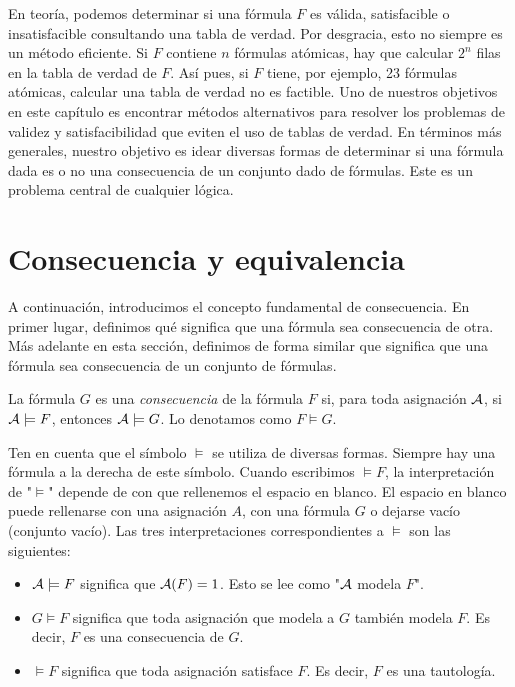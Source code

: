 \message{ !name(main.tex)}\documentclass[12pt,a4paper]{book}
\newcommand{\comillas}[1]{"#1"}
\begin{document}
    En teoría, podemos determinar si una fórmula $F$ es válida, satisfacible o insatisfacible consultando una tabla de verdad. Por desgracia, esto no siempre
    es un método eficiente. Si $F$ contiene $n$ fórmulas atómicas, hay que calcular $2^{n}$ filas en la tabla de verdad de $F$. Así pues, si $F$ tiene, por ejemplo,
    23 fórmulas atómicas, calcular una tabla de verdad no es factible. Uno de nuestros objetivos en este capítulo es encontrar métodos alternativos para resolver
    los problemas de validez y satisfacibilidad que eviten el uso de tablas de verdad. En términos más generales, nuestro objetivo es idear diversas formas de
    determinar si una fórmula dada es o no una consecuencia de un conjunto dado de fórmulas. Este es un problema central de cualquier lógica.

    \section{Consecuencia y equivalencia}

    A continuación, introducimos el concepto fundamental de consecuencia. En primer lugar, definimos qué significa que una fórmula sea consecuencia
    de otra. Más adelante en esta sección, definimos de forma similar que significa que una fórmula sea consecuencia de un conjunto de fórmulas.

    \begin{definicion}
        La fórmula $G$ es una \textit{consecuencia} de la fórmula $F$ si, para toda asignación $\AA$, si $\AA\models F$, entonces $\AA\models G$. Lo denotamos como
        $F\models G$.
    \end{definicion}

    Ten en cuenta que el símbolo $\models$ se utiliza de diversas formas. Siempre hay una fórmula a la derecha de este símbolo. Cuando escribimos $\models F$,
    la interpretación de \comillas{$\models$} depende de con que rellenemos el espacio en blanco. El espacio en blanco puede rellenarse con una asignación $A$,
    con una fórmula $G$ o dejarse vacío (conjunto vacío). Las tres interpretaciones correspondientes a $\models$ son las siguientes:

    \begin{itemize}
        \item[$\bullet$] $\AA\models F$ significa que $\AA(F)=1$. Esto se lee como \comillas{$\AA$ modela $F$}.
        \item[$\bullet$] $G\models F$ significa que toda asignación que modela a $G$ también modela $F$. Es decir, $F$ es una consecuencia de $G$.
        \item[$\bullet$] $\models F$ significa que toda asignación satisface $F$. Es decir, $F$ es una tautología.
    \end{itemize}
\end{document}
